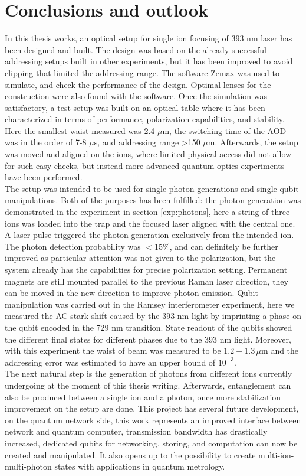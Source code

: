 
\chapter{Conclusions and outlook}
In this thesis works, an optical setup for single ion focusing of 393 nm laser has been designed and built. The design was based on the already successful addressing setups built in other experiments, but it has been improved to avoid clipping that limited the addressing range. The software Zemax was used to simulate, and check the performance of the design. Optimal lenses for the construction were also found with the software. Once the simulation was satisfactory, a test setup was built on an optical table where it has been characterized in terms of performance, polarization capabilities, and stability. Here the smallest waist measured was 2.4 $\mu$m, the switching time of the AOD was in the order of 7-8 $\mu$s, and addressing range >150 $\mu$m. Afterwards, the setup was moved and aligned on the ions, where limited physical access did not allow for such easy checks, but instead more advanced quantum optics experiments have been performed.\\
The setup was intended to be used for single photon generations and single qubit manipulations. Both of the purposes has been fulfilled: the photon generation was demonstrated in the experiment in section \ref{exp:photons}, here a string of three ions was loaded into the trap and the focused laser aligned with the central one. A laser pulse triggered the photon generation exclusively from the intended ion. The photon detection probability was $<15\%$, and can definitely be further improved as particular attention was not given to the polarization, but the system already has the capabilities for precise polarization setting. Permanent magnets are still mounted parallel to the previous Raman laser direction, they can be moved in the new direction to improve photon emission.
 Qubit manipulation was carried out in the Ramsey interferometer experiment, here we measured the AC stark shift caused by the 393 nm light by imprinting a phase on the qubit encoded in the 729 nm transition. State readout of the qubits showed the different final states for different phases due to the 393 nm light. Moreover, with this experiment the waist of beam was measured to be $1.2-1.3\,\mu$m and the addressing error was estimated to have an upper bound of $10^{-3}$.\\
The next natural step is the generation of photons from different ions currently undergoing at the moment of this thesis writing. Afterwards, entanglement can also be produced between a single ion and a photon, once more stabilization improvement on the setup are done. This project has several future development, on the quantum network side, this work represents an improved interface between network and quantum computer, transmission bandwidth has drastically increased, dedicated qubits for networking, storing, and computation can now be created and manipulated. It also opens up to the possibility to create multi-ion-multi-photon states with applications in quantum metrology.

